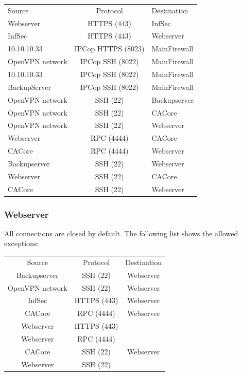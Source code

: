 \documentclass[a4paper, toc=index, 12pt, DIV14, twoside, BCOR2cm, headsepline, numbers=noenddot, bibliography=totoc]{report}
\begin{document}
\begin{tabular}{l c l}
Source & Protocol & Destination \\
\cline{1-3}
Webserver & HTTPS (443) & InfSec \\
\cline{1-3}
InfSec & HTTPS (443) & Webserver \\
\cline{1-3}
10.10.10.33 & IPCop HTTPS (8023) & MainFirewall\\
\cline{1-3}
OpenVPN network & IPCop SSH (8022) & MainFirewall \\
\cline{1-3}
10.10.10.33 & IPCop SSH (8022) & MainFirewall \\
\cline{1-3}
BackupServer & IPCop SSH (8022) & MainFirewall \\
\cline{1-3}
OpenVPN network & SSH (22) & Backupserver \\
\cline{1-3}
OpenVPN network & SSH (22) & CACore \\
\cline{1-3}
OpenVPN network & SSH (22) & Webserver \\
\cline{1-3}
Webserver & RPC (4444) & CACore \\
\cline{1-3}
CACore & RPC (4444) & Webserver \\
\cline{1-3}
Backupserver & SSH (22) & Webserver \\
\cline{1-3}
Webserver & SSH (22) & CACore \\
\cline{1-3}
CACore & SSH (22) & Webserver \\
\end{tabular}

\subsubsection{Webserver}
All connections are closed by default. The following list shows the allowed exceptions:\newline


\begin{tabular}{c c c}
Source & Protocol & Destination \\
\cline{1-3}
Backupserver & SSH (22) & Webserver \\
\cline{1-3}
OpenVPN network & SSH (22) & Webserver \\
\cline{1-3}
InfSec & HTTPS (443) & Webserver \\
\cline{1-3}
CACore & RPC (4444) & Webserver \\
\cline{1-3}
Webserver & HTTPS (443) &  \\
\cline{1-3}
Webserver & RPC (4444) &  \\
\cline{1-3}
CACore & SSH (22) & Webserver \\
\cline{1-3}
Webserver & SSH (22) &  \\
\end{tabular}
\end{document}
